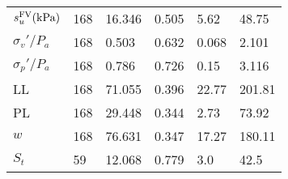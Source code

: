 \begin{table*}[!htb]
\begin{minipage}[t]{0.48\textwidth}
{\begin{tabularx}{\textwidth}{lXXXXX}
            \midrule
            $s_u^{\rm{FV}}\rm{(kPa)}$   & 168   & 16.346 & 0.505 & 5.62  & 48.75 \\
            $\sigma_v'/P_a$             & 168   & 0.503  & 0.632 & 0.068 & 2.101 \\
            $\sigma_p'/P_a$             & 168   & 0.786  & 0.726 & 0.15  & 3.116 \\
            LL                          & 168   & 71.055 & 0.396 & 22.77 & 201.81 \\
            PL                          & 168   & 29.448 & 0.344 & 2.73  & 73.92 \\
            $w$                         & 168   & 76.631 & 0.347 & 17.27 & 180.11 \\
            $S_t$                       & 59    & 12.068 & 0.779 & 3.0   & 42.5 \\
            \bottomrule
        \end{tabularx}}%
        \label{table:3}%
    \end{minipage}
\end{table*}
